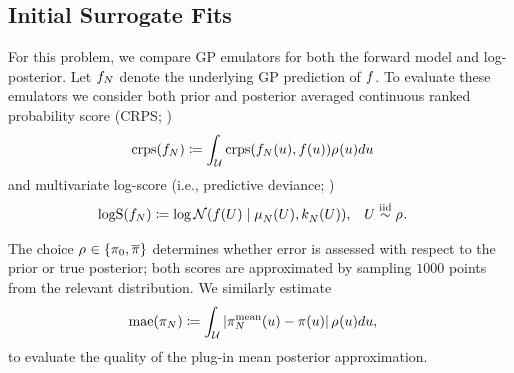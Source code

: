\documentclass[12pt]{article}
\begin{document}
\subsection{Initial Surrogate Fits}
For this problem, we compare GP emulators for both the forward model and log-posterior.
Let $\funcEm[\Ndesign]$ denote the underlying GP prediction of $\func$.
To evaluate these emulators we consider both prior and posterior averaged continuous
ranked probability score (CRPS; \citep{scoringRules})
\begin{align}
\mathrm{crps}(\funcEm[\Ndesign]) &\Def \int_{\parSpace} \mathrm{crps}(\funcEm[\Ndesign](\Par), \func(\Par)) \weightDens[](\Par) d\Par
\end{align}
and multivariate log-score (i.e., predictive deviance; \citep{scoringRules})
\begin{align}
\mathrm{logS}(\funcEm[\Ndesign]) 
&\Def \log \Gaussian(\func(\parMat) \given \emMean[\Ndesign]{}(\parMat), \emKer[\Ndesign]{}(\parMat)),
&&\parMat \overset{\mathrm{iid}}{\sim} \weightDens[].
\end{align}

The choice $\weightDens[] \in \{\priorDens, \postDensNorm\}$ determines whether error is assessed with
respect to the prior or true posterior; both scores are approximated by sampling $1000$ points 
from the relevant distribution. We similarly estimate 
\begin{align}
\mathrm{mae}(\postEm[\Ndesign]) &\Def 
\int_{\parSpace} \abs{\postApproxMean[\Ndesign](\Par) - \postDens(\Par)} \weightDens[](\Par) d\Par,
\end{align}
to evaluate the quality of the plug-in mean posterior approximation.
\end{document}

